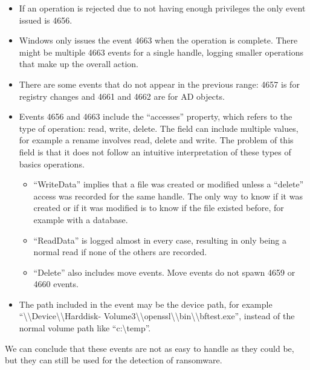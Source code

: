 \begin{itemize}
	\item If an operation is rejected due to not having enough privileges the only event issued is 4656.
	\item Windows only issues the event 4663 when the operation is complete. There might be multiple 4663 events for a single handle, logging smaller operations that make up the overall action.
	\item There are some events that do not appear in the previous range: 4657 is for registry changes and 4661 and 4662 are for AD objects.
	\item Events 4656 and 4663 include the ``accesses'' property, which refers to the type of operation: read, write, delete.
		The field can include multiple values, for example a rename involves read, delete and write.
		The problem of this field is that it does not follow an intuitive interpretation of these types of basics operations.
	\begin{itemize}
		\item``WriteData'' implies that a file was created or modified unless a ``delete'' access was recorded for the same handle. The only way to know if it was created or if it was modified is to know if the file existed before, for example with a database.
		\item``ReadData'' is logged almost in every case, resulting in only being a normal read if none of the others are recorded.
		\item``Delete'' also includes move events. Move events do not spawn 4659 or 4660 events.
	\end{itemize}
	\item The path included in the event may be the device path, for example ``{\textbackslash}{\textbackslash}Device{\textbackslash}{\textbackslash}Harddisk- Volume3{\textbackslash}{\textbackslash}openssl{\textbackslash}{\textbackslash}bin{\textbackslash}{\textbackslash}bftest.exe'', instead of the normal volume path like ``c:{\textbackslash}temp''.
\end{itemize}
\linej
We can conclude that these events are not as easy to handle as they could be, but they can still be used for the detection of ransomware.

